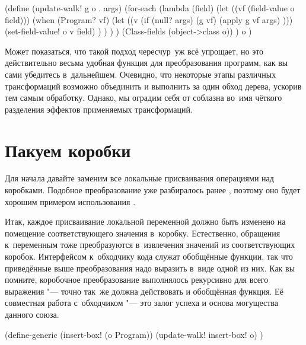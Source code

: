 \begin{code:lisp}
(define (update-walk! g o . args)
  (for-each (lambda (field)
              (let ((vf (field-value o field)))
                (when (Program? vf)
                  (let ((v (if (null? args) (g vf)
                               (apply g vf args) )))
                    (set-field-value! o v field) ) ) ) )
            (Class-fields (object->class o)) )
  o )
\end{code:lisp}

Может показаться, что такой подход чересчур~уж всё упрощает, но это
действительно весьма удобная функция для преобразования программ, как вы сами
убедитесь в~дальнейшем. Очевидно, что некоторые этапы различных трансформаций
возможно объединить и выполнить за один обход дерева, ускорив тем самым
обработку. Однако, мы оградим себя от соблазна во~имя чёткого разделения
эффектов применяемых трансформаций.


\section{Пакуем коробки}\label{cc/sect:boxes}

Для начала давайте заменим все локальные присваивания операциями над коробками.
Подобное преобразование уже разбиралось ранее
, поэтому оно будет хорошим примером
использования .

Итак, каждое присваивание локальной переменной должно быть изменено на помещение
соответствующего значения в~коробку. Естественно, обращения к~переменным тоже
преобразуются в~извлечения значений из соответствующих коробок. Интерфейсом
к~обходчику кода служат обобщённые функции, так что приведённые выше
преобразования надо выразить в~виде одной из них. Как вы помните, коробочное
преобразование выполнялось рекурсивно для всего выражения "--- точно так~же
должна действовать и обобщённая функция. Её совместная работа с~обходчиком "---
это залог успеха и основа могущества данного союза.


\begin{code:lisp}
(define-generic (insert-box! (o Program))
  (update-walk! insert-box! o) )
\end{code:lisp}

